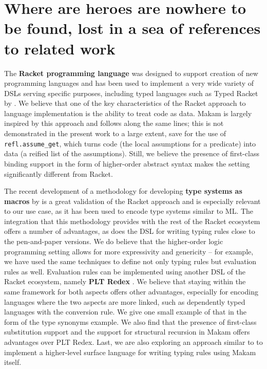 \section{Where are heroes are nowhere to be found, lost in a sea of
references to related
work}\label{where-are-heroes-are-nowhere-to-be-found-lost-in-a-sea-of-references-to-related-work}

\identNormal

The \textbf{Racket programming language} was designed to support
creation of new programming languages \citep{racket-manifesto} and has
been used to implement a very wide variety of DSLs serving specific
purposes, including typed languages such as Typed Racket by
\citet{typed-racket-main-reference}. We believe that one of the key
characteristics of the Racket approach to language implementation is the
ability to treat code as data. Makam is largely inspired by this
approach and follows along the same lines; this is not demonstrated in
the present work to a large extent, save for the use of
\texttt{refl.assume\_get}, which turns code (the local assumptions for a
predicate) into data (a reified list of the assumptions). Still, we
believe the presence of first-class binding support in the form of
higher-order abstract syntax makes the \lamprolog setting significantly
different from Racket.

The recent development of a methodology for developing \textbf{type
systems as macros} by \citet{racket-type-systems-as-macros} is a great
validation of the Racket approach and is especially relevant to our use
case, as it has been used to encode type systems similar to ML. The
integration that this methodology provides with the rest of the Racket
ecosystem offers a number of advantages, as does the
 DSL for writing typing rules close to the
pen-and-paper versions. We do believe that the higher-order logic
programming setting allows for more expressivity and genericity -- for
example, we have used the same techniques to define not only typing
rules but evaluation rules as well. Evaluation rules can be implemented
using another DSL of the Racket ecosystem, namely \textbf{PLT Redex}
\citep{felleisen2009semantics}. We believe that staying within the same
framework for both aspects offers other advantages, especially for
encoding languages where the two aspects are more linked, such as
dependently typed languages with the conversion rule. We give one small
example of that in the form of the type synonyms example. We also find
that the presence of first-class substitution support and the support
for structural recursion in Makam offers advantages over PLT Redex.
Last, we are also exploring an approach similar to 
to implement a higher-level surface language for writing typing rules
using Makam itself.

